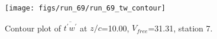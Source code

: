 \begin{figure}[H]
\centering
\texttt{[image: figs/run\_69/run\_69\_tw\_contour]}
\caption{Contour plot of $\overline{t^\prime w^\prime}$ at $z/c$=10.00, $V_{free}$=31.31, station 7.}
\label{fig:run_69_tw_contour}
\end{figure}


